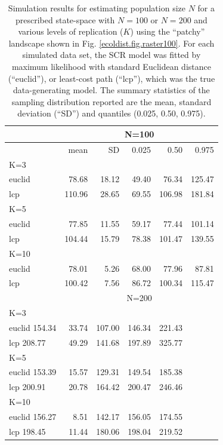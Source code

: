 \begin{table}[htp]
\label{tab.results1}
{\small
\caption{
Simulation results for estimating population size $N$ for a prescribed state-space with
$N=100$ or $N=200$ and various levels of replication ($K$)
using the ``patchy'' landscape shown in Fig. 
 \ref{ecoldist.fig.raster100}.
For each simulated
data set, the SCR model was fitted by maximum likelihood with
standard Euclidean distance (``euclid''), or least-cost path
(``lcp''), which was the true data-generating model.
The summary statistics of the
sampling distribution reported are the mean, standard deviation
(``SD'') and quantiles (0.025, 0.50, 0.975).
}
\begin{tabular}{l|rrrrr}
         & \multicolumn{5}{c}{N=100  }  \\ \hline
         &   mean &  SD  & 0.025 & 0.50  & 0.975   \\ \hline
K=3      &        &      &       &       &         \\
euclid   &  78.68 & 18.12& 49.40 & 76.34 & 125.47  \\
lcp      & 110.96 & 28.65& 69.55 &106.98 & 181.84  \\
K=5      &        &      &       &       &         \\
euclid   &  77.85 & 11.55& 59.17 & 77.44 & 101.14  \\
lcp      & 104.44 & 15.79& 78.38 &101.47 & 139.55  \\
K=10     &        &      &       &       &         \\
euclid   &  78.01 & 5.26 & 68.00 & 77.96 & 87.81   \\
lcp      & 100.42 & 7.56 & 86.72 &100.34 & 115.47  \\ \hline
        & \multicolumn{5}{c}{N=200   }  \\ \hline
K=3      &        &      &       &       &         \\
euclid  154.34& 33.74& 107.00& 146.34& 221.43\\
lcp     208.77& 49.29& 141.68& 197.89& 325.77\\
K=5           &      &       &       &        \\
euclid   153.39& 15.57& 129.31& 149.54& 185.38\\
lcp      200.91& 20.78& 164.42& 200.47& 246.46\\
K=10           &      &       &       &       \\
euclid   156.27&  8.51& 142.17& 156.05& 174.55\\
lcp      198.45& 11.44& 180.06& 198.04& 219.52\\ \hline
\end{tabular}
}
\label{ecoldist.tab.simresults}
\end{table}














